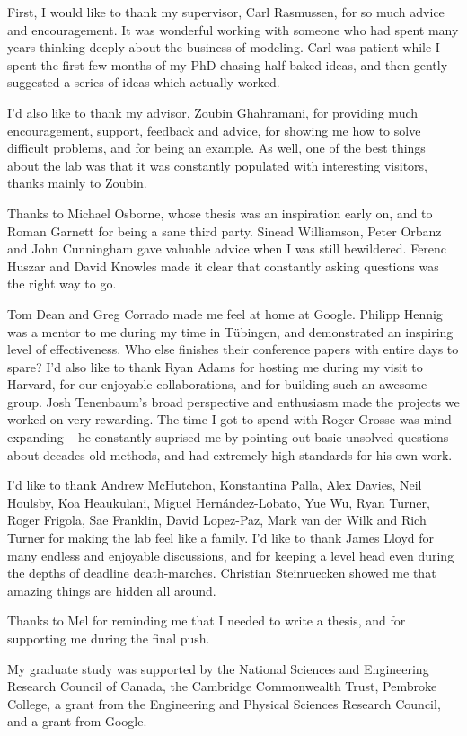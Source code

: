 
\begin{acknowledgements}      


First, I would like to thank my supervisor, Carl Rasmussen, for so much advice and encouragement.
It was wonderful working with someone who had spent many years thinking deeply about the business of modeling.
Carl was patient while I spent the first few months of my PhD chasing half-baked ideas, and then gently suggested a series of ideas which actually worked.

I'd also like to thank my advisor, Zoubin Ghahramani, for providing much encouragement, support, feedback and advice, for showing me how to solve difficult problems, and for being an example.
As well, one of the best things about the lab was that it was constantly populated with interesting visitors, thanks mainly to Zoubin.

Thanks to Michael Osborne, whose thesis was an inspiration early on, and to Roman Garnett for being a sane third party.
Sinead Williamson, Peter Orbanz and John Cunningham gave valuable advice when I was still bewildered.
Ferenc Huszar and David Knowles made it clear that constantly asking questions was the right way to go.

Tom Dean and Greg Corrado made me feel at home at Google.
Philipp Hennig was a mentor to me during my time in T\"{u}bingen, and demonstrated an inspiring level of effectiveness.
Who else finishes their conference papers with entire days to spare?
I'd also like to thank Ryan Adams for hosting me during my visit to Harvard, for our enjoyable collaborations, and for building such an awesome group.
Josh Tenenbaum's broad perspective and enthusiasm made the projects we worked on very rewarding.
The time I got to spend with Roger Grosse was mind-expanding -- he constantly suprised me by pointing out basic unsolved questions about decades-old methods, and had extremely high standards for his own work.

I'd like to thank Andrew McHutchon, Konstantina Palla, Alex Davies, Neil Houlsby, Koa Heaukulani, Miguel Hern\'{a}ndez-Lobato, Yue Wu, Ryan Turner, Roger Frigola, Sae Franklin, David Lopez-Paz, Mark van der Wilk and Rich Turner for making the lab feel like a family.
I'd like to thank James Lloyd for many endless and enjoyable discussions, and for keeping a level head even during the depths of deadline death-marches.
Christian Steinruecken showed me that amazing things are hidden all around.

Thanks to Mel for reminding me that I needed to write a thesis, and for supporting me during the final push.

My graduate study was supported by the National Sciences and Engineering Research Council of Canada, the Cambridge Commonwealth Trust, Pembroke College, a grant from the Engineering and Physical Sciences Research Council, and a grant from Google.

\end{acknowledgements}
